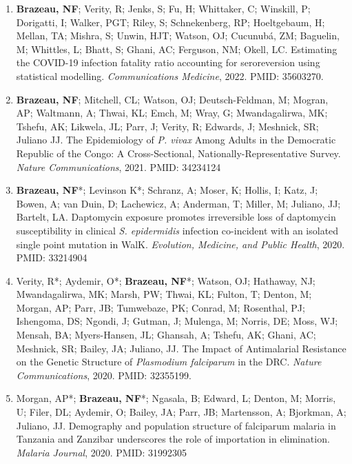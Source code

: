 \documentclass[11pt,letterpaper]{article}
\begin{document}
\begin{enumerate}[leftmargin=*, itemsep=4pt, parsep=0pt]

\item \textbf{Brazeau, NF}; Verity, R; Jenks, S; Fu, H; Whittaker, C; Winskill, P; Dorigatti, I; Walker, PGT; Riley, S; Schnekenberg, RP; Hoeltgebaum, H; Mellan, TA; Mishra, S; Unwin, HJT; Watson, OJ; Cucunubá, ZM; Baguelin, M; Whittles, L; Bhatt, S; Ghani, AC; Ferguson, NM; Okell, LC. Estimating the COVID-19 infection fatality ratio accounting for seroreversion using statistical modelling. \textit{Communications Medicine}, 2022. PMID: 35603270.

\item \textbf{Brazeau, NF}; Mitchell, CL; Watson, OJ; Deutsch-Feldman, M; Mogran, AP; Waltmann, A; Thwai, KL; Emch, M; Wray, G; Mwandagalirwa, MK; Tshefu, AK; Likwela, JL; Parr, J; Verity, R; Edwards, J; Meshnick, SR; Juliano JJ. The Epidemiology of \textit{P. vivax} Among Adults in the Democratic Republic of the Congo: A Cross-Sectional, Nationally-Representative Survey. \textit{Nature Communications}, 2021. PMID: 34234124

\item \textbf{Brazeau, NF}*; Levinson K*; Schranz, A; Moser, K; Hollis, I; Katz, J; Bowen, A; van Duin, D; Lachewicz, A; Anderman, T; Miller, M; Juliano, JJ; Bartelt, LA. Daptomycin exposure promotes irreversible loss of daptomycin susceptibility in clinical \textit{S. epidermidis} infection co-incident with an isolated single point mutation in WalK. \textit{Evolution, Medicine, and Public Health}, 2020. PMID: 33214904

\item Verity, R*; Aydemir, O*; \textbf{Brazeau, NF}*; Watson, OJ; Hathaway, NJ; Mwandagalirwa, MK; Marsh, PW; Thwai, KL; Fulton, T; Denton, M; Morgan, AP; Parr, JB; Tumwebaze, PK; Conrad, M; Rosenthal, PJ; Ishengoma, DS; Ngondi, J; Gutman, J; Mulenga, M; Norris, DE; Moss, WJ; Mensah, BA; Myers-Hansen, JL; Ghansah, A; Tshefu, AK; Ghani, AC; Meshnick, SR; Bailey, JA; Juliano, JJ. The Impact of Antimalarial Resistance on the Genetic Structure of \textit{Plasmodium falciparum} in the DRC. \textit{Nature Communications}, 2020. PMID: 32355199.

\item Morgan, AP*; \textbf{Brazeau, NF}*; Ngasala, B; Edward, L; Denton, M; Morris, U; Filer, DL; Aydemir, O; Bailey, JA; Parr, JB; Martensson, A; Bjorkman, A; Juliano, JJ. Demography and population structure of falciparum malaria in Tanzania and Zanzibar underscores the role of importation in elimination. \textit{Malaria Journal}, 2020. PMID: 31992305


\end{enumerate}
\end{document}
